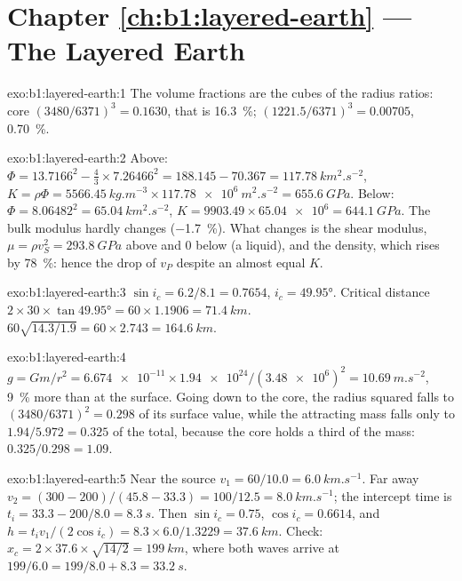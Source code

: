 \section*{Chapter \ref{ch:b1:layered-earth} --- The Layered Earth}

\begin{solution}{exo:b1:layered-earth:1}
The volume fractions are the cubes of the radius ratios: core
$(3480/6371)^3 = 0.1630$, that is \qty{16.3}{\percent}; 
$(1221.5/6371)^3 = 0.00705$, \qty{0.70}{\percent}.
\end{solution}

\begin{solution}{exo:b1:layered-earth:2}
Above: $\Phi = 13.7166^2 - \tfrac43\times7.26466^2 = 188.145 - 70.367 =
\qty{117.78}{km^2.s^{-2}}$, $K = \rho\Phi = \qty{5566.45}{kg.m^{-3}}\times
\qty{117.78e6}{m^2.s^{-2}} = \qty{655.6}{GPa}$. Below: $\Phi = 8.06482^2 =
\qty{65.04}{km^2.s^{-2}}$, $K = 9903.49\times\num{65.04e6} = \qty{644.1}{GPa}$.
The bulk modulus hardly changes (\qty{-1.7}{\percent}). What changes is the
shear modulus, $\mu = \rho v_S^2 = \qty{293.8}{GPa}$ above and $0$ below (a
liquid), and the density, which rises by \qty{78}{\percent}: hence the drop of
$v_P$ despite an almost equal $K$.
\end{solution}

\begin{solution}{exo:b1:layered-earth:3}
$\sin i_c = 6.2/8.1 = 0.7654$, $i_c = \ang{49.95}$. Critical distance
$2\times30\times\tan\ang{49.95} = 60\times1.1906 = \qty{71.4}{km}$.  $60\sqrt{14.3/1.9} = 60\times2.743 = \qty{164.6}{km}$.
\end{solution}

\begin{solution}{exo:b1:layered-earth:4}
$g = Gm/r^2 = \num{6.674e-11}\times\num{1.94e24}/(\num{3.48e6})^2 =
\qty{10.69}{m.s^{-2}}$, \qty{9}{\percent} more than at the surface. Going down
to the core, the radius squared falls to $(3480/6371)^2 = 0.298$ of its surface
value, while the attracting mass falls only to $1.94/5.972 = 0.325$ of the total,
because the core holds a third of the mass: $0.325/0.298 = 1.09$.
\end{solution}

\begin{solution}{exo:b1:layered-earth:5}
Near the source $v_1 = 60/10.0 = \qty{6.0}{km.s^{-1}}$. Far away
$v_2 = (300 - 200)/(45.8 - 33.3) = 100/12.5 = \qty{8.0}{km.s^{-1}}$; the
intercept time is $t_i = 33.3 - 200/8.0 = \qty{8.3}{s}$. Then $\sin i_c =
0.75$, $\cos i_c = 0.6614$, and $h = t_i v_1/(2\cos i_c) = 8.3\times6.0/1.3229
= \qty{37.6}{km}$. Check: $x_c = 2\times37.6\times\sqrt{14/2} = \qty{199}{km}$,
where both waves arrive at $199/6.0 = 199/8.0 + 8.3 = \qty{33.2}{s}$.
\end{solution}

